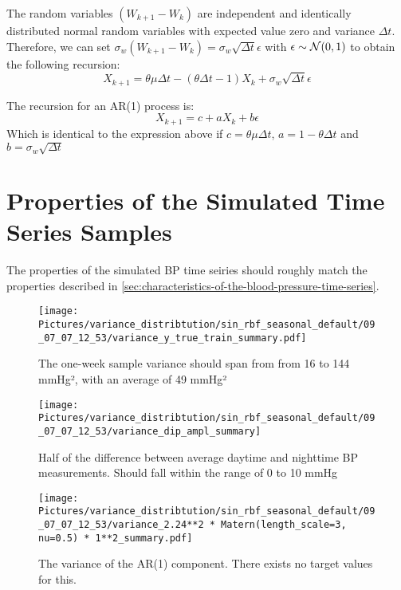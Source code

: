 The random variables $(W_{k+1} - W_k)$ are independent and identically distributed normal random variables
with expected value zero and variance $\Delta t$.
Therefore, we can set $\sigma_w (W_{k+1} - W_k) = \sigma_w \sqrt{\Delta t} \epsilon$ with $\epsilon \sim \operatorname{\mathcal{N}}(0,1)$
to obtain the following recursion:
$$ X_{k+1} = \theta \mu \Delta t - (\theta \Delta t - 1) X_k + \sigma_w \sqrt{\Delta t} \epsilon$$

The recursion for an AR(1) process is:
$$ X_{k+1} = c + a X_k + b \epsilon$$
Which is identical to the expression above if $c= \theta \mu \Delta t$, $a=1- \theta \Delta t$ and
$b= \sigma_w \sqrt{\Delta t}$



\section{Properties of the Simulated Time Series Samples}\label{sec:properties-of-the-simulated-time-series-samples}

The properties of the simulated BP time seiries should roughly match the
properties described in \ref{sec:characteristics-of-the-blood-pressure-time-series}.

\begin{figure}[h!]
    \centering
    \texttt{[image: 
        Pictures/variance\_distribtution/sin\_rbf\_seasonal\_default/09\_07\_07\_12\_53/variance\_y\_true\_train\_summary.pdf]}
    \caption{The one-week sample variance should span from from 16 to 144 mmHg², with an average of 49 mmHg²}
    \label{fig:variance}
\end{figure}

\begin{figure}[h!]
    \centering
    \texttt{[image: 
       Pictures/variance\_distribtution/sin\_rbf\_seasonal\_default/09\_07\_07\_12\_53/variance\_dip\_ampl\_summary]}
    \caption{Half of the difference between average daytime and nighttime BP measurements. Should fall
    within the range of 0 to 10 mmHg}
    \label{fig:dip_ampl}
\end{figure}



\begin{figure}[h!]
    \centering
    \texttt{[image: 
       Pictures/variance\_distribtution/sin\_rbf\_seasonal\_default/09\_07\_07\_12\_53/variance\_2.24**2 * Matern(length\_scale=3, nu=0.5) * 1**2\_summary.pdf]}
    \caption{The variance of the AR(1) component. There exists no target values for this.}
    \label{fig:var_matern}
\end{figure}

